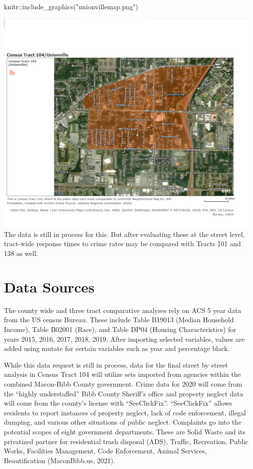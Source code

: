 \documentclass[
]{article}
\newenvironment{Shaded}{\begin{snugshade}}{\end{snugshade}}
\newcommand{\FunctionTok}[1]{\textcolor[rgb]{0.00,0.00,0.00}{#1}}
\newcommand{\NormalTok}[1]{#1}
\newcommand{\SpecialCharTok}[1]{\textcolor[rgb]{0.00,0.00,0.00}{#1}}
\newcommand{\StringTok}[1]{\textcolor[rgb]{0.31,0.60,0.02}{#1}}
\begin{document}
\begin{Shaded}
\begin{Highlighting}[]
\NormalTok{knitr}\SpecialCharTok{::}\FunctionTok{include\_graphics}\NormalTok{(}\StringTok{"unionvillemap.png"}\NormalTok{)}
\end{Highlighting}
\end{Shaded}

\includegraphics{unionvillemap.png} The data is still in process for
this. But after evaluating these at the street level, tract-wide
response times to crime rates may be compared with Tracts 101 and 138 as
well.

\hypertarget{data-sources}{%
\section{Data Sources}\label{data-sources}}

The county wide and three tract comparative analyses rely on ACS 5 year
data from the US census Bureau. These include Table B19013 (Median
Household Income), Table B02001 (Race), and Table DP04 (Housing
Characteristics) for years 2015, 2016, 2017, 2018, 2019. After importing
selected variables, values are added using mutate for certain variables
such as year and percentage black.

While this data request is still in process, data for the final street
by street analysis in Census Tract 104 will utilize sets imported from
agencies within the combined Macon-Bibb County government. Crime data
for 2020 will come from the ``highly understaffed'' Bibb County
Sheriff's office and property neglect data will come from the county's
license with ``SeeClickFix''. ``SeeClickFix'' allows residents to report
instances of property neglect, lack of code enforcement, illegal
dumping, and various other situations of public neglect. Complaints go
into the potential scopes of eight government departments. These are
Solid Waste and its privatized partner for residential trash disposal
(ADS), Traffic, Recreation, Public Works, Facilities Management, Code
Enforcement, Animal Services, Beautification (MaconBibb.us, 2021).
\end{document}
